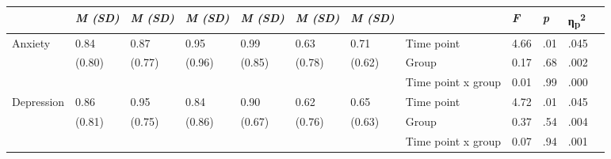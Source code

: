 \documentclass[authordate, empirical,issue]{jote-new-article}
\begin{document}
\begin{table}[th!]
\begin{fullwidth}
{\begin{tabular}{@{} l l l l l l l | l l l l l @{}}
        \hline                                         & \emph{M (SD)}                                 & \emph{M (SD)}        & \emph{M (SD)}        & \emph{M (SD)} & \emph{M (SD)}
                                                       & \emph{M (SD)}                                 &                      & \emph{F}             & \emph{p}      & η\textsubscript{p}\textsuperscript{2}
        \\

        \hline   Anxiety                               & 0.84                                          & 0.87                 & 0.95                 & 0.99          & 0.63                                  & 0.71   & Time point         & 4.66 & .01  & .045 \\
                                                       & (0.80)                                        & (0.77)               & (0.96)               & (0.85)        & (0.78)                                & (0.62) & Group              & 0.17 & .68  & .002 \\
                                                       &                                               &                      &                      &               &                                       &        & Time point x group & 0.01 & .99  & .000 \\

        \hline Depression                              & 0.86                                          & 0.95                 & 0.84                 & 0.90          & 0.62                                  & 0.65   & Time point         & 4.72 & .01  & .045 \\
                                                       & (0.81)                                        & (0.75)               & (0.86)               & (0.67)        & (0.76)                                & (0.63) & Group              & 0.37 & .54  & .004 \\
                                                       &                                               &                      &                      &               &                                       &        & Time point x group & 0.07 & .94  & .001 \\


\end{tabular}}
\end{fullwidth}
\end{table}
\end{document}
